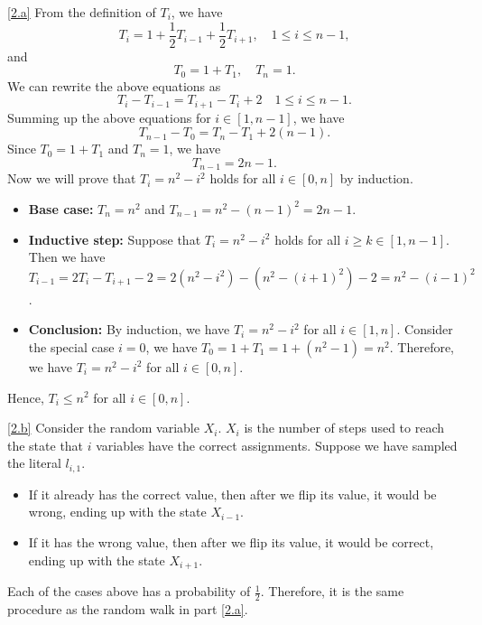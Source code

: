 \documentclass{homework}
\begin{document}
\begin{solution}

  \ref{2.a}
  From the definition of $T_{i}$, we have
  \begin{equation*}
    T_{i} = 1 + \frac{1}{2}T_{i-1} + \frac{1}{2}T_{i+1}, \quad 1 \le i \le n - 1,
  \end{equation*}
  and
  \begin{equation*}
    T_{0} = 1 + T_{1}, \quad T_{n} = 1.
  \end{equation*}
  We can rewrite the above equations as
  \begin{equation*}
    T_{i} - T_{i-1} = T_{i+1} - T_{i} + 2 \quad 1 \le i \le n - 1.
  \end{equation*}
  Summing up the above equations for $i \in [1, n - 1]$, we have
  \begin{equation*}
    T_{n-1} - T_{0} = T_{n} - T_{1} + 2(n-1).
  \end{equation*}
  Since $T_{0} = 1 + T_{1}$ and $T_{n} = 1$, we have
  \begin{equation*}
    T_{n-1} = 2n-1.
  \end{equation*}
  Now we will prove that $T_{i} = n^2 - i^2$ holds for all $i \in [0, n]$ by induction.

  \begin{itemize}
    \item \textbf{Base case:} $T_{n} = n^2$ and $T_{n - 1} = n^2 - (n - 1)^2 = 2n - 1$.
    \item \textbf{Inductive step:} Suppose that $T_{i} = n^2 - i^2$ holds for
          all $i \ge k \in [1, n - 1]$.
    Then we have $T_{i - 1} = 2T_i - T_{i + 1} - 2 = 2(n^2 - i^2) - (n^2 - (i + 1)^2) - 2 = n^2 - (i - 1)^2$.
    \item \textbf{Conclusion:} By induction, we have $T_{i} = n^2 - i^2$ for all $i \in [1, n]$.
          Consider the special case $i = 0$, we have $T_{0} = 1 + T_{1} = 1 + (n^2 - 1) = n^2$.
          Therefore, we have $T_{i} = n^2 - i^2$ for all $i \in [0, n]$.
  \end{itemize}
  Hence, $T_{i} \le n^2$ for all $i \in [0, n]$.

  \ref{2.b}
  Consider the random variable $X_i$. $X_i$ is the number of steps used to
  reach the state that $i$ variables have the correct assignments.
  Suppose we have sampled the literal $l_{i, 1}$.
  \begin{itemize}
    \item If it already has the correct value, then after we flip its value,
          it would be wrong, ending up with the state $X_{i - 1}$.
    \item If it has the wrong value, then after we flip its value,
          it would be correct, ending up with the state $X_{i + 1}$.
  \end{itemize}
  Each of the cases above has a probability of $\frac{1}{2}$.
  Therefore, it is the same procedure as the random walk in part \ref{2.a}.
  

\end{solution}
\end{document}
